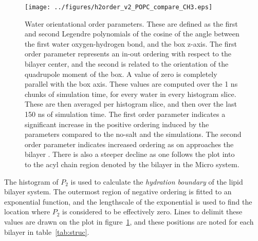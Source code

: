 \begin{figure}[H]
    \caption[Water orientational ordering]{Water orientational order parameters. These are defined as the first and second Legendre polynomials of the cosine of the angle between the first water oxygen-hydrogen bond, and the box z-axis. The first
    order parameter represents an in-out ordering with respect to the bilayer center, and the second is related to the orientation of the quadrupole moment of the box. A value of zero is completely
    parallel with the box axis. These values are computed over the 1 ns chunks of simulation time, for every water in every histogram slice. These are then averaged per histogram slice, and then over the last 150 ns of simulation time. {\color{blue} The first order parameter indicates a significant increase in the positive ordering induced by the  parameters compared to the no-salt and the
         simulations.  The second order parameter indicates increased ordering as on approaches the bilayer \dhh{}. There is also a steeper decline as one follows the plot into to the acyl chain region denoted by the bilayer \dc{} in the
 Micro system.}}
    \label{fig:h2order}
    \texttt{[image: ../figures/h2order\_v2\_POPC\_compare\_CH3.eps]}
\end{figure}
The histogram of $P_2$ is used to calculate the \emph{hydration boundary} of the lipid bilayer system. The outermost
region of negative ordering is fitted to an exponential function, and the lengthscale of the exponential is used to find the location where $P_2$ is considered to be effectively zero.
Lines to delimit these values are drawn on the plot in figure~\ref{fig:h2order}, and these positions are noted for each bilayer
in table~\ref{tab:struc}.
